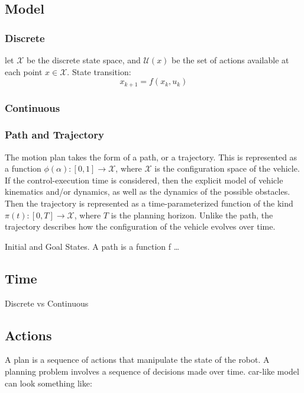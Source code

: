 \subsection{Model}

\subsubsection{Discrete}
let \(\mathcal{X}\) be the discrete state space, and \(\mathcal{U}(x)\) be the
set of actions available at each point \(x \in \mathcal{X}\). State transition:\
\[
  x_{k+1} = f(x_k, u_k)
\]

\subsubsection{Continuous}

\subsubsection{Path and Trajectory}

The motion plan takes the form of a path, or a trajectory. This is represented
as a function \(\phi(\alpha) \colon [0,1] \rightarrow \mathcal{X}\), where
\(\mathcal{X}\) is the configuration space of the vehicle. If the
control-execution time is considered, then the explicit model of vehicle
kinematics and/or dynamics, as well as the dynamics of the possible obstacles.
Then the trajectory is represented as a time-parameterized function of the kind
\(\pi(t) \colon [0,T] \rightarrow \mathcal{X}\), where \(T\) is the planning
horizon. Unlike the path, the trajectory describes how the configuration of the
vehicle evolves over time.

Initial and Goal States. A path is a function f \ldots

\subsection{Time}

Discrete vs Continuous

\subsection{Actions}

A plan is a sequence of actions that manipulate the state of the robot. A
planning problem involves a sequence of decisions made over time. car-like model
can look something like:

